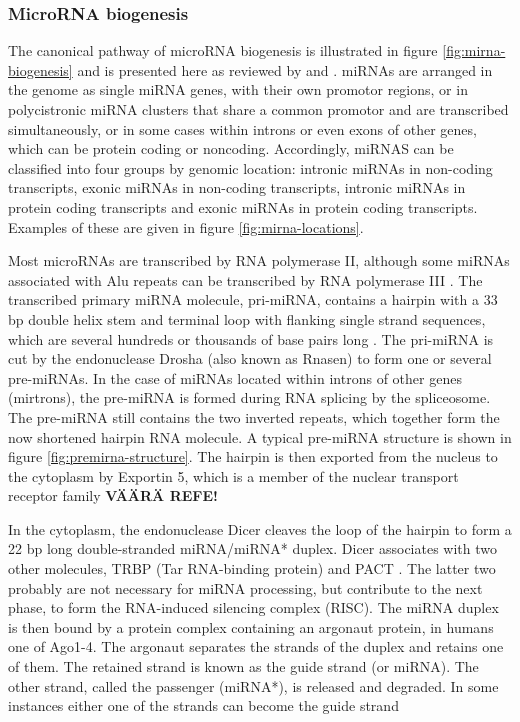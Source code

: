 



\subsubsection{MicroRNA biogenesis}\label{microrna-biogenesis}

The canonical pathway of microRNA biogenesis is illustrated in figure
\ref{fig:mirna-biogenesis} and is presented here as reviewed by  
\citet{Bartel2004} and \citet{Denzler2015}. miRNAs are arranged in the genome as
single miRNA genes, with their own promotor regions, or in polycistronic miRNA
clusters that share a common promotor and are transcribed simultaneously, or
in some cases within introns or even exons of other genes, which can be
protein coding or noncoding. Accordingly, miRNAS can be classified into four
groups by genomic location: intronic miRNAs in non-coding transcripts, exonic
miRNAs in non-coding transcripts, intronic miRNAs in protein coding
transcripts and exonic miRNAs in protein coding transcripts. Examples of these
are given in figure \ref{fig:mirna-locations}.

Most microRNAs are transcribed by RNA polymerase II, although some miRNAs
associated with Alu repeats can be transcribed by RNA polymerase III
\citep{Borchert2006}. The transcribed primary miRNA molecule, pri-miRNA, contains a
hairpin with a 33 bp double helix stem and terminal loop with flanking single
strand sequences, which are several hundreds or thousands of base pairs long
\citep{Kim2005}. The pri-miRNA is cut by the endonuclease Drosha (also known as
Rnasen) to form one or several pre-miRNAs. In the case of miRNAs located
within introns of other genes (mirtrons), the pre-miRNA is formed during RNA
splicing by the spliceosome. The pre-miRNA still contains the two inverted
repeats, which together form the now shortened hairpin RNA molecule. A typical
pre-miRNA structure is shown in figure \ref{fig:premirna-structure}. The
hairpin is then exported from the nucleus to the cytoplasm by Exportin 5,
which is a member of the nuclear transport receptor family \citep{T8??} \textbf{VÄÄRÄ REFE!}

In the cytoplasm, the endonuclease Dicer cleaves the loop of the hairpin to
form a 22 bp long double-stranded miRNA/miRNA* duplex. Dicer associates with
two other molecules, TRBP (Tar RNA-binding protein) and PACT \citep{Tref}. The
latter two probably are not necessary for miRNA processing, but contribute to
the next phase, to form the RNA-induced silencing complex (RISC). The miRNA
duplex is then bound by a protein complex containing an argonaut protein, in
humans one of Ago1-4. The argonaut separates the strands of the duplex and
retains one of them. The retained strand is known as the guide strand (or
miRNA). The other strand, called the passenger (miRNA*), is released and
degraded. In some instances either one of the strands can become the guide strand

